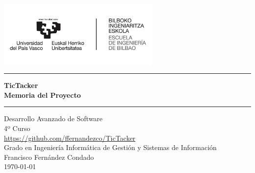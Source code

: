\begin{titlepage}
\begin{center}
\vspace{2cm}
\includegraphics[width=0.6\textwidth]{root/bie.jpg}~\\[1cm]
\vspace{2cm}

\hrule
\vspace{.5cm}
{ \huge \bfseries TicTacker \\ \vspace{.5cm} Memoria del Proyecto}
\vspace{.5cm}

\hrule
\vspace{1.5cm}


\Large Desarrollo Avanzado de Software\\
\vspace{0.5cm}
\large 4º Curso\\
\vspace{1cm}
\url{https://github.com/ffernandezco/TicTacker}\\
\vspace{1cm}
\Large Grado en Ingeniería Informática de Gestión y Sistemas de Información\\
\vspace{1cm}
\large Francisco Fernández Condado\\
\vspace{0.5cm}
\large \today\\

\end{center}
\end{titlepage}